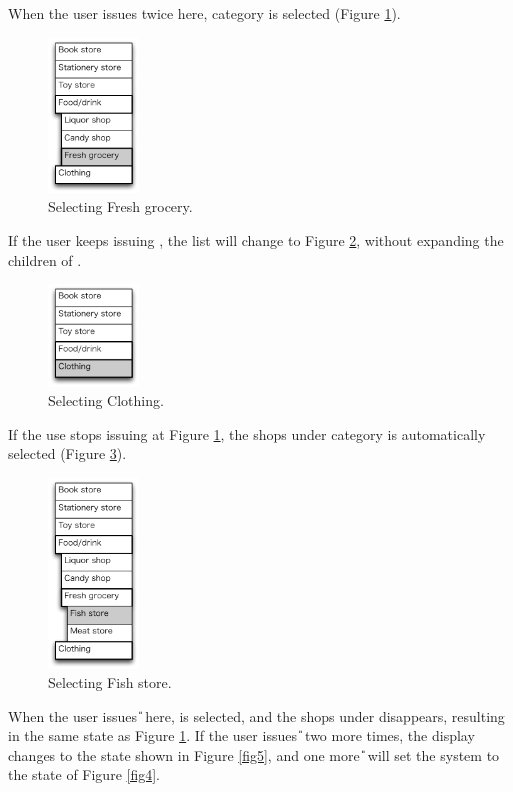 \documentclass{article}
\begin{document}
When the user issues {\D} twice here,
 category is selected (Figure \ref{fig6}).

\begin{figure}[H]
\centerline{\includegraphics[width=24mm,bb=0 0 139 238]{figures/fig6.pdf}}
\caption{Selecting Fresh grocery.}
\label{fig6}
\end{figure}

If the user keeps issuing {\D}, 
the list will change to Figure \ref{fig8},
without expanding the children of .

\begin{figure}[H]
\centerline{\includegraphics[width=24mm,bb=0 0 139 157]{figures/fig8.pdf}}
\caption{Selecting Clothing.}
\label{fig8}
\end{figure}

If the use stops issuing {\D} at Figure \ref{fig6},
the shops under category  is automatically selected (Figure \ref{fig7}).

\begin{figure}[H]
\centerline{\includegraphics[width=24mm,bb=0 0 139 292]{figures/fig7.pdf}}
\caption{Selecting Fish store.}
\label{fig7}
\end{figure}

When the user issues {\U} here,  is selected,
and the shops under  disappears, 
resulting in the same state as Figure \ref{fig6}.
If the user issues {\U} two more times, the display changes to the state
shown in Figure \ref{fig5},
and one more {\U} will set the system to the state of Figure \ref{fig4}.
\end{document}

